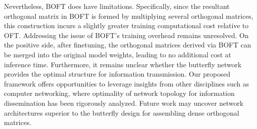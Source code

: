 Nevertheless, BOFT does have limitations. Specifically, since the resultant orthogonal matrix in BOFT is formed by multiplying several orthogonal matrices, this construction incurs a slightly greater training computational cost relative to OFT. Addressing the issue of BOFT’s training overhead remains unresolved. On the positive side, after finetuning, the orthogonal matrices derived via BOFT can be merged into the original model weights, leading to no additional cost at inference time. Furthermore, it remains unclear whether the butterfly network provides the optimal structure for information transmission. Our proposed framework offers opportunities to leverage insights from other disciplines such as computer networking, where optimality of network topology for information dissemination has been rigorously analyzed. Future work may uncover network architectures superior to the butterfly design for assembling dense orthogonal matrices.